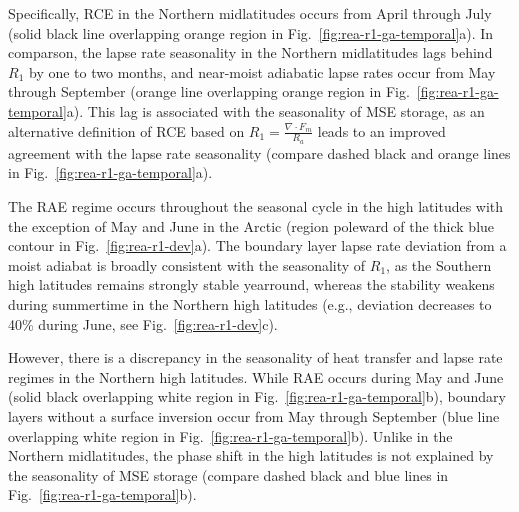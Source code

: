 \documentclass{ametsocV5}
\begin{document}
    Specifically, RCE in the Northern midlatitudes occurs from April through July (solid black line overlapping orange region in Fig.~\ref{fig:rea-r1-ga-temporal}a). In comparson, the lapse rate seasonality in the Northern midlatitudes lags behind $R_1$ by one to two months, and near-moist adiabatic lapse rates occur from May through September (orange line overlapping orange region in Fig.~\ref{fig:rea-r1-ga-temporal}a). This lag is associated with the seasonality of MSE storage, as an alternative definition of RCE based on $R_1=\frac{\nabla\cdot F_m}{R_a}$ leads to an improved agreement with the lapse rate seasonality (compare dashed black and orange lines in Fig.~\ref{fig:rea-r1-ga-temporal}a). %

    The RAE regime occurs throughout the seasonal cycle in the high latitudes with the exception of May and June in the Arctic (region poleward of the thick blue contour in Fig.~\ref{fig:rea-r1-dev}a). The boundary layer lapse rate deviation from a moist adiabat is broadly consistent with the seasonality of $R_1$, as the Southern high latitudes remains strongly stable yearround, whereas the stability weakens during summertime in the Northern high latitudes (e.g., deviation decreases to 40\% during June, see Fig.~\ref{fig:rea-r1-dev}c). 

    However, there is a discrepancy in the seasonality of heat transfer and lapse rate regimes in the Northern high latitudes. While RAE occurs during May and June (solid black overlapping white region in Fig.~\ref{fig:rea-r1-ga-temporal}b), boundary layers without a surface inversion occur from May through September (blue line overlapping white region in Fig.~\ref{fig:rea-r1-ga-temporal}b). Unlike in the Northern midlatitudes, the phase shift in the high latitudes is not explained by the seasonality of MSE storage (compare dashed black and blue lines in Fig.~\ref{fig:rea-r1-ga-temporal}b).
    
\end{document}
